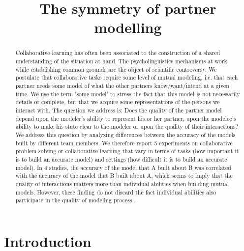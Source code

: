 \documentclass[natbib]{svjour3}
\title{The symmetry of partner modelling}
\author{}
\begin{document}
\maketitle

\begin{abstract}
    Collaborative learning has often been associated to the construction of  a shared   understanding of the situation at hand. The psycholinguistics mechanisms
    at work while establishing common grounds are the object of scientific controversy. We postulate that collaborative tasks require some level of mutual 
    modeling, i.e. that each partner needs some model of what the other partners know/want/intend at a given time.  We use the term 'some model' to stress the fact that this model is not necessarily details or complete, but that we acquire some representations of the persons we interact with. The question we address is: 
Does the quality of the partner model depend upon the modeler's ability to represent his or her partner, upon the modelee's ability to make his state clear to the modeler or upon the quality of their interactions? We address this question by analyzing differences between the  accuracy of the models built by different team members. We therefore report 5 experiments on collaborative problem solving or collaborative learning that vary in terms of tasks (how important it is to build an accurate model) and settings (how difficult it is to build an accurate model). In 4 studies, the accuracy of the model that A built about B was correlated with the accuracy of the model that B built about A,  which seems to imply that the quality of interactions matters more than individual abilities when building mutual models.  However, these finding do not discard the fact individual abilities also  participate in the quality of modellng process .


\end{abstract}


\section{Introduction}
\end{document}
